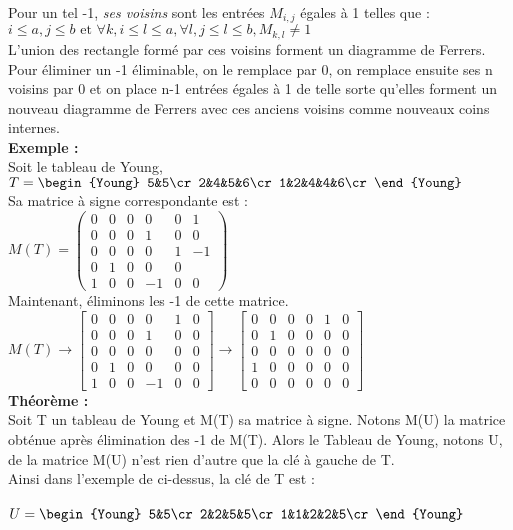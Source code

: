 \documentclass{book}
\begin{document}
Pour un tel -1, \textit{ses voisins} sont les entrées $M_{i,j}$ égales à 1 telles que : \\
$i  \leq a, j \leq b \mbox{ et } \forall k, i\leq l \leq a, \forall l, j \leq l \leq b, M_{k,l} \ne 1$\\

L'union des rectangle formé par ces voisins forment un diagramme de Ferrers.\\

Pour éliminer un -1 éliminable, on le remplace par 0, on remplace ensuite ses n voisins par 0 et on place n-1 entrées égales à 1 de telle sorte qu'elles forment un nouveau diagramme de Ferrers avec ces anciens voisins comme nouveaux coins internes. \\

\textbf{Exemple : }\\
Soit le tableau de Young, 
$ T = 
\begin{Young}
5&5\cr
2&4&5&6\cr
1&2&4&4&6\cr
\end{Young}  
  $\\
Sa matrice à signe correspondante est : \\

$M(T) = \begin{pmatrix}
0&0&0&0&0&1\\0&0&0&1&0&0\\0&0&0&0&1&-1\\0&1&0&0&0\\1&0&0&-1&0&0
\end{pmatrix}$   \\

Maintenant, éliminons les -1 de cette matrice.\\

$M(T) \rightarrow \begin{bmatrix}
0&0&0&0&1&0\\0&0&0&1&0&0\\0&0&0&0&0&0\\0&1&0&0&0&0\\1&0&0&-1&0&0
\end{bmatrix}
  \rightarrow \begin{bmatrix}
0&0&0&0&1&0\\0&1&0&0&0&0\\0&0&0&0&0&0\\1&0&0&0&0&0\\0&0&0&0&0&0
\end{bmatrix}
 $\\

\textbf{Théorème : } \\
Soit T un tableau de Young et M(T) sa matrice à signe. Notons M(U) la matrice obténue après élimination des -1 de M(T). Alors le Tableau de Young, notons U, de la matrice M(U) n'est rien d'autre que la clé à gauche de T. \\
Ainsi dans l'exemple de ci-dessus, la clé de T est :\\\\
$ U = 
\begin{Young}
5&5\cr
2&2&5&5\cr
1&1&2&2&5\cr
\end{Young}  
$\\
\end{document}
